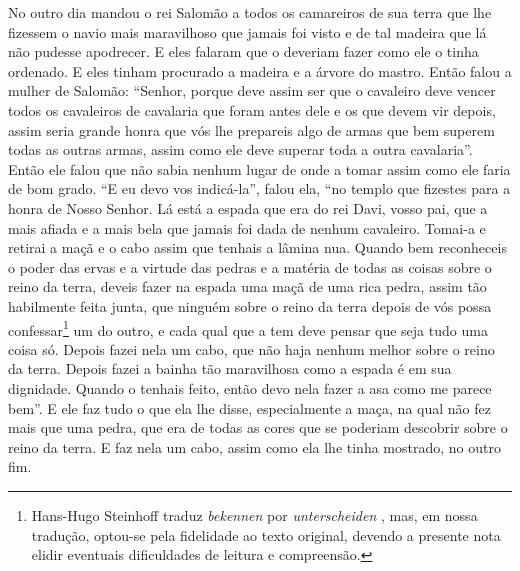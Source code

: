 No outro dia mandou o rei Salomão a todos os camareiros de sua terra que lhe
fizessem o navio mais maravilhoso que jamais foi visto e de tal madeira que lá
não pudesse apodrecer. E eles falaram que o deveriam fazer como ele o tinha
ordenado. E eles tinham procurado a madeira e a árvore do mastro. Então falou a
mulher de Salomão: “Senhor, porque deve assim ser que o cavaleiro deve vencer
todos os cavaleiros de cavalaria que foram antes dele e os que devem vir
depois, assim seria grande honra que vós lhe prepareis algo de armas que bem
superem todas as outras armas, assim como ele deve superar toda a outra
cavalaria”. Então ele falou que não sabia nenhum lugar de onde a tomar
assim como ele faria de bom grado. “E eu devo vos indicá-la”, falou ela, “no
templo que fizestes para a honra de Nosso Senhor. Lá está a espada que era do
rei Davi, vosso pai, que a mais afiada e a mais bela que jamais foi dada de
nenhum cavaleiro. Tomai-a e retirai a maçã e o cabo assim que tenhais a lâmina
nua. Quando bem reconheceis o poder das ervas e a virtude das pedras e a
matéria de todas as coisas sobre o reino da terra, deveis fazer na espada uma
maçã de uma rica pedra, assim tão habilmente feita junta, que ninguém sobre o
reino da terra depois de vós possa confessar\footnote{ Hans-Hugo Steinhoff
traduz \textit{bekennen}  por \textit{unterscheiden}
, mas, em nossa tradução, optou-se pela fidelidade ao texto
original, devendo a presente nota elidir eventuais dificuldades de leitura e
compreensão.}  um do outro, e cada qual que a tem deve pensar que
seja tudo uma coisa só. Depois fazei nela um cabo, que não haja nenhum melhor
sobre o reino da terra. Depois fazei a bainha tão maravilhosa como a espada é
em sua dignidade. Quando o tenhais feito, então devo nela fazer a asa como me
parece bem”. E ele faz tudo o que ela lhe disse, especialmente a maça, na qual
não fez mais que uma pedra, que era de todas as cores que se poderiam descobrir
sobre o reino da terra. E faz nela um cabo, assim como ela lhe tinha mostrado,
no outro fim. 

